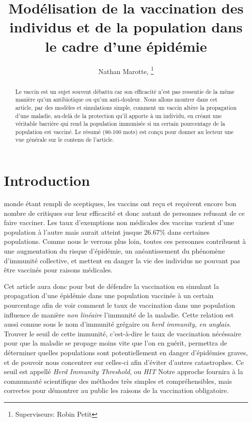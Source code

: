 \documentclass[journal, a4paper]{IEEEtran}
\begin{document}
	\title{Modélisation de la vaccination des individus et de la population dans le cadre d'une épidémie}
	\author{Nathan Marotte,
	\thanks{Superviseurs: Robin Petit}}
	\maketitle

\begin{abstract}
	Le vaccin est un sujet souvent débattu car son efficacité n'est pas ressentie de la même manière qu'un antibiotique ou qu'un anti-douleur. Nous allons montrer dans cet article, par des modèles et simulations simple, comment un vaccin altère la propagation d'une maladie, au-delà de la protection qu'il apporte à un individu, en créant une véritable barrière qui rend la population immunisée si un certain pourcentage de la population est vacciné.
	Le résumé (80-100 mots) est conçu pour donner au lecteur une vue générale sur le contenu de l'article.
\end{abstract}

\section{Introduction}
	 monde étant rempli de sceptiques, les vaccins ont reçu et reçoivent encore bon nombre de critiques sur leur efficacité et donc autant de personnes refusant de ce faire vacciner. Les taux d'exemptions non médicales des vaccins varient d'une population à l'autre mais aurait atteint jusque 26.67\%\cite{NME_vaccine} dans certaines populations. Comme nous le verrons plus loin, toutes ces personnes contribuent à une augmentation du risque d'épidémie, un anéantissement du phénomène d'immunité collective, et mettent en danger la vie des individus ne pouvant pas être vaccinés pour raisons médicales.\

	Cet article aura donc pour but de défendre la vaccination en simulant la propagation d'une épidémie dans une population vaccinée à un certain pourcentage afin de voir comment le taux de vaccination dans une population influence de manière \emph{non linéaire} l'immunité de la maladie. Cette relation est aussi connue sous le nom d'immunité grégaire ou \emph{herd immunity, en anglais}.
	Trouver le seuil de cette immunité, c'est-à-dire le taux de vaccination nécéssaire pour que la maladie se propage moins vite que l'on en guérit, permettra de déterminer quelles populations sont potentiellement en danger d'épidémies graves, et de pouvoir nous concentrer sur celles-ci afin d'éviter d'autres catastrophes. Ce seuil est appellé \emph{Herd Immunity Threshold}, ou \emph{HIT}
	Notre approche fournira à la communauté scientifique des méthodes très simples et compréhensibles, mais correctes pour démontrer au public les raisons de la vaccination obligatoire.
\end{document}
